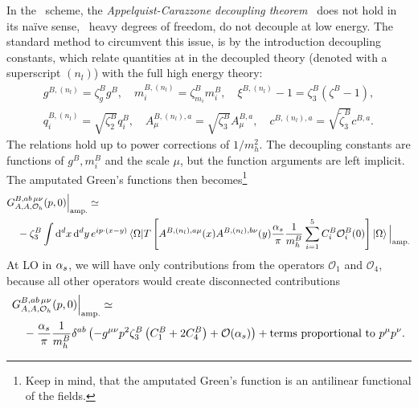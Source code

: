 In the \MS\ scheme, the \textit{Appelquist-Carazzone decoupling theorem}~\cite{Appelquist:1974tg} does not hold in its na\"ive sense, \ie\ heavy degrees of freedom, do not decouple at low energy. The standard method to circumvent this issue, is by the introduction decoupling constants, which relate quantities at in the decoupled theory (denoted with a superscript $(n_l)$) with the full high energy theory:
\begin{equation}
\begin{gathered}
g^{B, (n_l)} = \zeta_g^B g^{B}, \quad m_i^{B, (n_l)} = \zeta_{m_i}^B m_i^B, \quad \xi^{B,(n_l)} - 1 = \zeta_3^{B} (\zeta^{B} - 1), \\
q_i^{B,(n_l)} = \sqrt{\zeta_2^B} q_i^{B}, \quad A_\mu^{B,(n_l),a} = \sqrt{\zeta_3^B} A^{B, a}_\mu, \quad c^{B,(n_l),a} = \sqrt{\tilde{\zeta}_3^B} c^{B,a}.
\end{gathered}
\end{equation}
The relations hold up to power corrections of $1/m_h^2$. The decoupling constants are functions of $g^B, m_i^B$ and the scale $\mu$, but the function arguments are left implicit. The amputated Green's functions then becomes\footnote{Keep in mind, that the amputated Green's function is an antilinear functional of the fields.}
\begin{equation}
\begin{split}
&G_{A,A,\mathcal{O}_h}^{B,ab\, \mu\nu} (p, 0) \Big \vert_{\text{amp.}} \simeq \\
&\quad- \zeta_3^B \int \mathrm{d}^d x\, \mathrm{d}^d y\, e^{ip\cdot (x - y)} \braket{\Omega| T \left[ A^{B,(n_l),a\mu}(x) A^{B, (n_l), b \nu}(y) \frac{\alpha_s}{\pi} \frac{1}{m_h^B} \sum_{i=1}^5 C_i^B \mathcal{O}_i^B(0) \right] |\Omega} \Big \vert_{\text{amp.}} \\
\end{split}
\end{equation}
At \acs{LO} in $\alpha_s$, we will have only contributions from the operators $\mathcal{O}_1$ and $\mathcal{O}_4$, because all other operators would create disconnected contributions
\begin{equation}
\begin{split}
&G_{A,A,\mathcal{O}_h}^{B,ab\, \mu\nu} (p, 0) \Big \vert_{\text{amp.}}  \simeq \\
&\quad -\frac{\alpha_s}{\pi} \frac{1}{m_h^B}\delta^{ab} \left(-g^{\mu \nu} p^2 \zeta_3^B \left( C_1^B + 2 C_4^B \right) + \mathcal{O}\!\left(\alpha_s\right) \right) + \text{terms proportional to } p^\mu p^\nu .
\end{split}
\end{equation}
